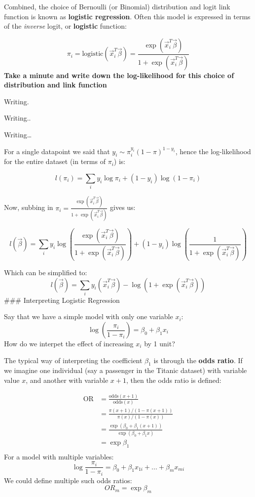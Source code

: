 \documentclass[
]{article}
\begin{document}
Combined, the choice of Bernoulli (or Binomial) distribution and logit
link function is known as \textbf{logistic regression}. Often this model
is expressed in terms of the \emph{inverse} logit, or \textbf{logistic}
function:

\[
\pi_i = \text{logistic}(\vec{x}_i^T \vec{\beta}) = \frac{\exp{(\vec{x}_i^T \vec{\beta})} }{1+\exp{(\vec{x}_i^T \vec{\beta})}}
\] \textbf{Take a minute and write down the log-likelihood for this
choice of distribution and link function}

Writing.

Writing..

Writing\ldots{}

For a single datapoint we said that
\(y_i \sim \pi_i^{y_i} (1-\pi)^{1-y_i}\), hence the log-likelihood for
the entire dataset (in terms of \(\pi_i\)) is:

\[
l(\pi_i) = \sum_i y_i \log\pi_i + (1-y_i) \log(1-\pi_i)
\]

Now, subbing in
\(\pi_i = \frac{\exp{(\vec{x}_i^T \vec{\beta})} }{1+\exp{(\vec{x}_i^T \vec{\beta})}}\)
gives us:

\[
l(\vec{\beta}) = \sum_i y_i \log{\left(\frac{\exp{(\vec{x}_i^T \vec{\beta})} }{1+\exp{(\vec{x}_i^T \vec{\beta})}} \right)} + (1-y_i) \log{\left( \frac{1}{1+\exp{(\vec{x}_i^T \vec{\beta})}} \right)}
\]

Which can be simplified to: \[
l(\vec{\beta}) = \sum_i y_i (\vec{x}_i^T \vec{\beta} ) - \log{(1+\exp{(\vec{x}_i^T \vec{\beta})})}
\] \#\#\# Interpreting Logistic Regression

Say that we have a simple model with only one variable \(x_i\): \[
\log{\left( \frac{\pi_i}{1-\pi_i} \right)} = \beta_0 + \beta_1 x_i
\] How do we interpet the effect of increasing \(x_i\) by 1 unit?

The typical way of interpreting the coefficient \(\beta_1\) is through
the \textbf{odds ratio}. If we imagine one individual (say a passenger
in the Titanic dataset) with variable value \(x\), and another with
variable \(x+1\), then the odds ratio is defined:

\[
\begin{split}
\text{OR} &= \frac{ \text{odds}(x+1) }{\text{odds}(x)} \\
&= \frac{\pi(x+1)/(1-\pi(x+1))}{ \pi(x)/(1-\pi(x))}\\
&= \frac{\exp{(\beta_0 + \beta_1(x+1))}}{\exp{(\beta_0 + \beta_1 x)}}\\
&= \exp \beta_1\\
\end{split}
\] For a model with multiple variables: \[
\log{\frac{\pi_i}{1-\pi_i}} = \beta_0 + \beta_1 x_{1i} + ... + \beta_m x_{mi}
\] We could define multiple such odds ratios: \[
OR_m = \exp{\beta_m}
\]
\end{document}
